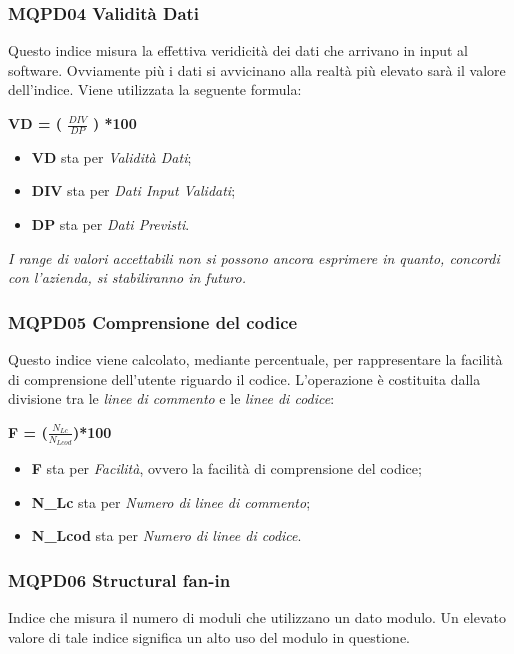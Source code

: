 \subsubsection{MQPD04 Validità Dati}\label{ProcessiDiSupportoVerificaMetricheMQQPD04ValiditàDati}
Questo indice misura la effettiva veridicità dei dati che arrivano in input al software. Ovviamente più i dati si avvicinano alla realtà più elevato sarà il valore dell'indice.
Viene utilizzata la seguente formula:
\begin{center}
	\textbf{VD = ( $\frac{DIV}{DP}$ ) *100}
\end{center}
\begin{itemize}
	\item \textbf{VD} sta per \textit{Validità Dati};
	\item \textbf{DIV} sta per \textit{Dati Input Validati};
	\item \textbf{DP} sta per \textit{Dati Previsti}.
\end{itemize}
\textit{I range di valori accettabili non si possono ancora esprimere in quanto, concordi con l'azienda, si stabiliranno in futuro.}

\subsubsection{MQPD05 Comprensione del codice}\label{ProcessiDiSupportoVerificaMetricheMQPD05CompresioneDelCodice}
Questo indice viene calcolato, mediante percentuale, per rappresentare la facilità di comprensione dell'utente riguardo il codice.
L'operazione è costituita dalla divisione tra le \textit{linee di commento} e le \textit{linee di codice}:
\begin{center}
	\textbf{F = ($\frac{N_{Lc}}{N_{Lcod}}$)*100}
\end{center}
\begin{itemize}
	\item \textbf{F} sta per \textit{Facilità}, ovvero la facilità di comprensione del codice;
	\item \textbf{N\_Lc} sta per \textit{Numero di linee di commento};
	\item \textbf{N\_Lcod} sta per \textit{Numero di linee di codice}.
\end{itemize}

\subsubsection{MQPD06 Structural fan-in} \label{ProcessiDiSupportoVerificaMetricheMQPD06Structuralfanin}
Indice che misura il numero di moduli che utilizzano un dato modulo. Un elevato valore di tale indice significa un alto uso del modulo in questione. 

